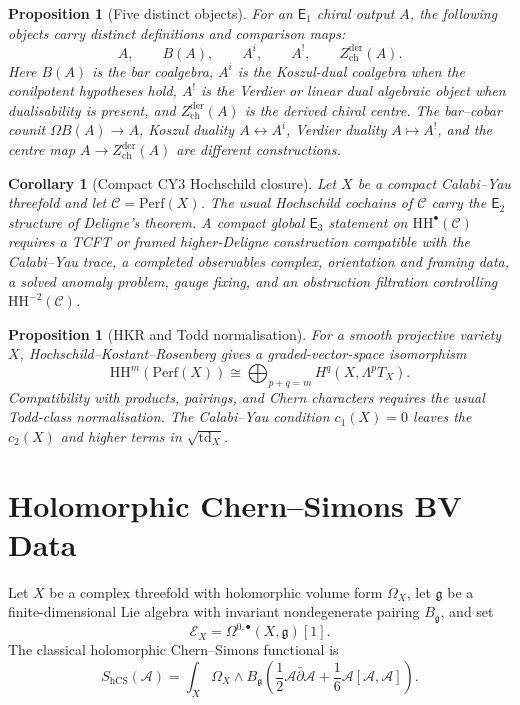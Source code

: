 \documentclass[11pt]{amsart}
\newtheorem{proposition}[theorem]{Proposition}
\newtheorem{corollary}[theorem]{Corollary}
\theoremstyle{definition}
\theoremstyle{remark}
\providecommand{\Etwo}{\mathsf{E}_2}
\providecommand{\Ethree}{\mathsf{E}_3}
\providecommand{\Eone}{\mathsf{E}_1}
\providecommand{\cC}{\mathcal{C}}
\providecommand{\HH}{\mathrm{HH}}
\providecommand{\hCS}{\mathrm{hCS}}
\providecommand{\Perf}{\mathrm{Perf}}
\providecommand{\gfrak}{\mathfrak{g}}
\begin{document}
\begin{proposition}[Five distinct objects]
\label{prop:five-objects}
For an $\Eone$ chiral output $A$, the following objects carry distinct
definitions and comparison maps:
\[
A,\qquad B(A),\qquad A^i,\qquad A^!,\qquad
Z^{\mathrm{der}}_{\mathrm{ch}}(A).
\]
Here $B(A)$ is the bar coalgebra, $A^i$ is the Koszul-dual coalgebra when
the conilpotent hypotheses hold, $A^!$ is the Verdier or linear dual
algebraic object when dualisability is present, and
$Z^{\mathrm{der}}_{\mathrm{ch}}(A)$ is the derived chiral centre. The
bar--cobar counit $\Omega B(A)\to A$, Koszul duality
$A\leftrightarrow A^i$, Verdier duality $A\mapsto A^!$, and the centre
map $A\to Z^{\mathrm{der}}_{\mathrm{ch}}(A)$ are different
constructions.
\end{proposition}

\begin{corollary}[Compact CY3 Hochschild closure]
\label{cor:cy3-global-closure-hypotheses}
Let $X$ be a compact Calabi--Yau threefold and let $\cC=\Perf(X)$. The
usual Hochschild cochains of $\cC$ carry the $\Etwo$ structure of
Deligne's theorem. A compact global $\Ethree$ statement on
$\HH^\bullet(\cC)$ requires a TCFT or framed higher-Deligne construction
compatible with the Calabi--Yau trace, a completed observables complex,
orientation and framing data, a solved anomaly problem, gauge fixing,
and an obstruction filtration controlling $\HH^{-2}(\cC)$.
\end{corollary}

\begin{proposition}[HKR and Todd normalisation]
\label{prop:hkr-todd}
For a smooth projective variety $X$, Hochschild--Kostant--Rosenberg
gives a graded-vector-space isomorphism
\[
\HH^m(\Perf(X))\cong
\bigoplus_{p+q=m}H^q(X,\Lambda^pT_X).
\]
Compatibility with products, pairings, and Chern characters requires the
usual Todd-class normalisation. The Calabi--Yau condition $c_1(X)=0$
leaves the $c_2(X)$ and higher terms in $\sqrt{\mathrm{td}_X}$.
\end{proposition}

\section{Holomorphic Chern--Simons BV Data}
\label{sec:hcs-bv-data}

Let $X$ be a complex threefold with holomorphic volume form $\Omega_X$,
let $\gfrak$ be a finite-dimensional Lie algebra with invariant
nondegenerate pairing $B_\gfrak$, and set
\[
\mathcal E_X=\Omega^{0,\bullet}(X,\gfrak)[1].
\]
The classical holomorphic Chern--Simons functional is
\begin{equation}
S_{\hCS}(\mathcal A)=
\int_X\Omega_X\wedge
B_\gfrak\!\left(
\frac12\mathcal A\bar\partial\mathcal A+
\frac16\mathcal A[\mathcal A,\mathcal A]
\right).
\label{eq:hcs-action}
\end{equation}
\end{document}
